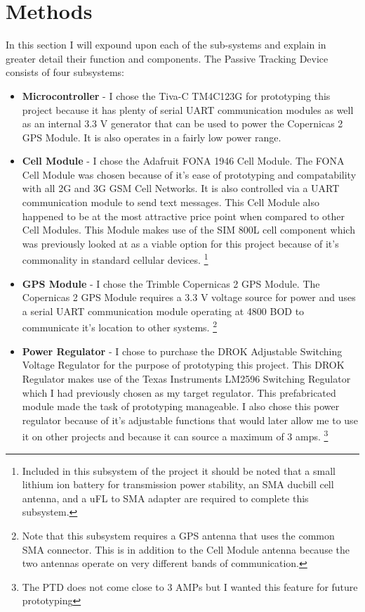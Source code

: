 \documentclass[11pt]{article}
\begin{document}
\section{Methods}
In this section I will expound upon each of the sub-systems and explain in greater detail their function and components.
The Passive Tracking Device consists of four subsystems:
\begin{itemize}
    \item \textbf{Microcontroller} - I chose the Tiva-C TM4C123G for prototyping this project because it has plenty of serial
          UART communication modules as well as an internal 3.3 V generator that can be used to power the Copernicas 2 GPS Module. 
          It is also operates in a fairly low power range. 

    \item \textbf{Cell Module} - I chose the Adafruit FONA 1946 Cell Module. The FONA Cell Module was chosen because of it's ease of prototyping
          and compatability with all 2G and 3G GSM Cell Networks. It is also controlled via a UART communication module to send text messages. This Cell Module 
          also happened to be at the most attractive price point when compared to other Cell Modules. This Module makes use of the SIM 800L cell component
          which was previously looked at as a viable option for this project because of it's commonality in standard cellular devices. 
          \footnote{Included in this subsystem of the project it should be noted that a small lithium ion battery for transmission 
          power stability, an SMA ducbill cell antenna, and a uFL to SMA adapter are required to complete this subsystem.} 

    \item \textbf{GPS Module} - I chose the Trimble Copernicas 2 GPS Module. The Copernicas 2 GPS Module requires a 3.3 V voltage source for power and uses a serial UART 
          communication module operating at 4800 BOD to communicate it's location to other systems. \footnote{Note that this subsystem requires a GPS antenna that
          uses the common SMA connector. This is in addition to the Cell Module antenna because the two antennas operate on very different bands of communication.} 

    \item \textbf{Power Regulator} - I chose to purchase the DROK Adjustable Switching Voltage Regulator for the purpose of prototyping this project. This DROK Regulator makes
          use of the Texas Instruments LM2596 Switching Regulator which I had previously chosen as my target regulator. This prefabricated module made the task of
          prototyping manageable. I also chose this power regulator because of it's adjustable functions that would later allow me to use it on other projects and 
          because it can source a maximum of 3 amps. \footnote{The PTD does not come close to 3 AMPs but I wanted this feature for future prototyping} 
\end{itemize} 
\end{document}
